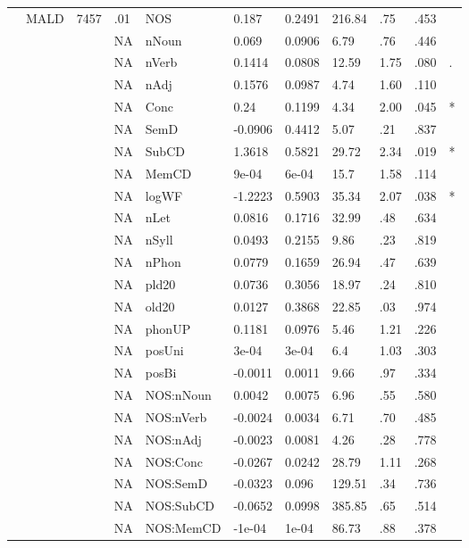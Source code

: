 \begin{table}[ht]
\begin{tabular}{lllllllllll}
   & MALD & 7457 & .01 & NOS & 0.187 & 0.2491 & 216.84 & .75 & .453 &   \\ 
   &  &  & NA & nNoun & 0.069 & 0.0906 & 6.79 & .76 & .446 &   \\ 
   &  &  & NA & nVerb & 0.1414 & 0.0808 & 12.59 & 1.75 & .080 & . \\ 
   &  &  & NA & nAdj & 0.1576 & 0.0987 & 4.74 & 1.60 & .110 &   \\ 
   &  &  & NA & Conc & 0.24 & 0.1199 & 4.34 & 2.00 & .045 & * \\ 
   &  &  & NA & SemD & -0.0906 & 0.4412 & 5.07 & .21 & .837 &   \\ 
   &  &  & NA & SubCD & 1.3618 & 0.5821 & 29.72 & 2.34 & .019 & * \\ 
   &  &  & NA & MemCD & 9e-04 & 6e-04 & 15.7 & 1.58 & .114 &   \\ 
   &  &  & NA & logWF & -1.2223 & 0.5903 & 35.34 & 2.07 & .038 & * \\ 
   &  &  & NA & nLet & 0.0816 & 0.1716 & 32.99 & .48 & .634 &   \\ 
   &  &  & NA & nSyll & 0.0493 & 0.2155 & 9.86 & .23 & .819 &   \\ 
   &  &  & NA & nPhon & 0.0779 & 0.1659 & 26.94 & .47 & .639 &   \\ 
   &  &  & NA & pld20 & 0.0736 & 0.3056 & 18.97 & .24 & .810 &   \\ 
   &  &  & NA & old20 & 0.0127 & 0.3868 & 22.85 & .03 & .974 &   \\ 
   &  &  & NA & phonUP & 0.1181 & 0.0976 & 5.46 & 1.21 & .226 &   \\ 
   &  &  & NA & posUni & 3e-04 & 3e-04 & 6.4 & 1.03 & .303 &   \\ 
   &  &  & NA & posBi & -0.0011 & 0.0011 & 9.66 & .97 & .334 &   \\ 
   &  &  & NA & NOS:nNoun & 0.0042 & 0.0075 & 6.96 & .55 & .580 &   \\ 
   &  &  & NA & NOS:nVerb & -0.0024 & 0.0034 & 6.71 & .70 & .485 &   \\ 
   &  &  & NA & NOS:nAdj & -0.0023 & 0.0081 & 4.26 & .28 & .778 &   \\ 
   &  &  & NA & NOS:Conc & -0.0267 & 0.0242 & 28.79 & 1.11 & .268 &   \\ 
   &  &  & NA & NOS:SemD & -0.0323 & 0.096 & 129.51 & .34 & .736 &   \\ 
   &  &  & NA & NOS:SubCD & -0.0652 & 0.0998 & 385.85 & .65 & .514 &   \\ 
   &  &  & NA & NOS:MemCD & -1e-04 & 1e-04 & 86.73 & .88 & .378 &   \\ 

\end{tabular}
\end{table}
